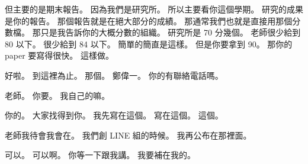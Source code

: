 \hypertarget{w01:cue:1549}{}但主要的是期末報告。
\hypertarget{w01:cue:1550}{}因為我們是研究所。
\hypertarget{w01:cue:1551}{}所以主要看你這個學期。
\hypertarget{w01:cue:1552}{}研究的成果是你的報告。
\hypertarget{w01:cue:1553}{}那個報告就是在絕大部分的成績。
\hypertarget{w01:cue:1554}{}那通常我們也就是直接用那個分數檔。
\hypertarget{w01:cue:1555}{}那只是我告訴你的大概分數的組織。
\hypertarget{w01:cue:1556}{}研究所是 70 分幾個。
\hypertarget{w01:cue:1557}{}老師很少給到 80 以下。
\hypertarget{w01:cue:1558}{}很少給到 84 以下。
\hypertarget{w01:cue:1559}{}簡單的簡直是這樣。
\hypertarget{w01:cue:1560}{}但是你要拿到 90。
\hypertarget{w01:cue:1561}{}那你的 paper 要寫得很快。
\hypertarget{w01:cue:1562}{}這樣做。

\hypertarget{w01:cue:1563}{}好啦。
\hypertarget{w01:cue:1564}{}到這裡為止。
\hypertarget{w01:cue:1565}{}那個。
\hypertarget{w01:cue:1566}{}鄭偉一。
\hypertarget{w01:cue:1567}{}你的有聯絡電話嗎。

\hypertarget{w01:cue:1568}{}老師。
\hypertarget{w01:cue:1569}{}你要。
\hypertarget{w01:cue:1570}{}我自己的嘛。

\hypertarget{w01:cue:1571}{}你的。
\hypertarget{w01:cue:1572}{}大家找得到你。
\hypertarget{w01:cue:1573}{}我先寫在這個。
\hypertarget{w01:cue:1574}{}寫在這個。
\hypertarget{w01:cue:1575}{}這個。

\hypertarget{w01:cue:1576}{}老師我待會我會在。
\hypertarget{w01:cue:1577}{}我們創 LINE 組的時候。
\hypertarget{w01:cue:1578}{}我再公布在那裡面。

\hypertarget{w01:cue:1579}{}可以。
\hypertarget{w01:cue:1580}{}可以啊。
\hypertarget{w01:cue:1581}{}你等一下跟我講。
\hypertarget{w01:cue:1582}{}我要補在我的。


